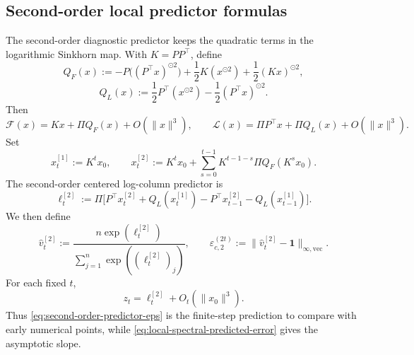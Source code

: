 \documentclass[10pt]{article}
\numberwithin{equation}{section}
\theoremstyle{plain}
\theoremstyle{definition}
\theoremstyle{remark}
\newcommand{\ones}{\mathbf{1}}
\begin{document}
\subsection{Second-order local predictor formulas}\label{app:second-order-predictor}

The second-order diagnostic predictor keeps the quadratic terms in the
logarithmic Sinkhorn map.  With \(K=PP^\top\), define
\begin{equation}\label{eq:QF-QL}
        Q_F(x)
        :=
        -P\big((P^\top x)^{\odot2}\big)
        +\frac12 K(x^{\odot2})
        +\frac12 (Kx)^{\odot2},
\end{equation}
\begin{equation}\label{eq:QL}
        Q_L(x)
        :=
        \frac12 P^\top(x^{\odot2})
        -\frac12 (P^\top x)^{\odot2}.
\end{equation}
Then
\begin{equation}\label{eq:F-L-second-expansion}
        \mathcal F(x)=Kx+\Pi Q_F(x)+O(\|x\|^3),
        \qquad
        \mathcal L(x)=\Pi P^\top x+\Pi Q_L(x)+O(\|x\|^3).
\end{equation}
Set
\begin{equation}\label{eq:second-order-x}
        x_t^{[1]}:=K^t x_0,
        \qquad
        x_t^{[2]}
        :=
        K^t x_0+
        \sum_{s=0}^{t-1}K^{t-1-s}\Pi Q_F(K^s x_0).
\end{equation}
The second-order centered log-column predictor is
\begin{equation}\label{eq:second-order-predictor-log}
        \ell_t^{[2]}
        :=
        \Pi\Big[
        P^\top x_t^{[2]}+Q_L(x_t^{[1]})
        -P^\top x_{t-1}^{[2]}-Q_L(x_{t-1}^{[1]})
        \Big].
\end{equation}
We then define
\begin{equation}\label{eq:second-order-predictor-eps}
        \widehat v_t^{[2]}
        :=
        \frac{n\exp(\ell_t^{[2]})}{\sum_{j=1}^n\exp((\ell_t^{[2]})_j)},
        \qquad
        \widehat\varepsilon_{c,2}^{(2t)}
        :=
        \|\widehat v_t^{[2]}-\ones\|_{\infty,\mathrm{vec}}.
\end{equation}
For each fixed \(t\),
\begin{equation}\label{eq:second-order-accuracy}
        z_t=\ell_t^{[2]}+O_t(\|x_0\|^3).
\end{equation}
Thus \eqref{eq:second-order-predictor-eps} is the finite-step prediction
to compare with early numerical points, while
\eqref{eq:local-spectral-predicted-error} gives the asymptotic slope.
\end{document}
